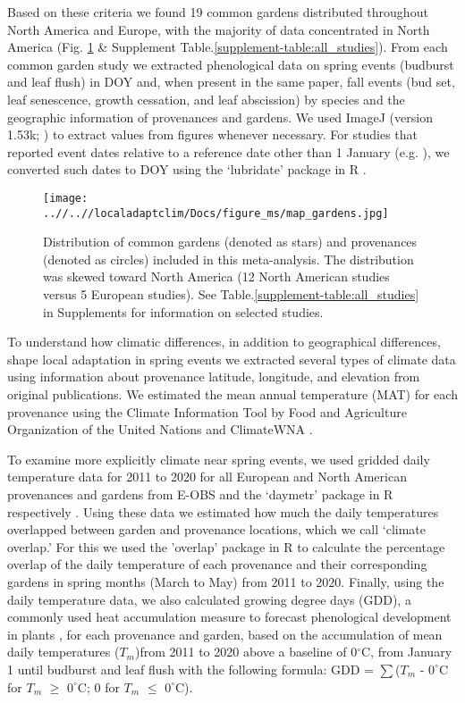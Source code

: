 \documentclass{article}
\begin{document}
Based on these criteria we found 19 common gardens distributed throughout North America and Europe, with the majority of data concentrated in North America (Fig. \ref{figure:map_gardens} \& Supplement Table.\ref{supplement-table:all_studies}). From each common garden study we extracted phenological data on spring events (budburst and leaf flush) in DOY and, when present in the same paper, fall events (bud set, leaf senescence, growth cessation, and leaf abscission) by species and the geographic information of provenances and gardens. We used ImageJ (version 1.53k; \citealp{schneider_rasband_eliceiri_2012}) to extract values from figures whenever necessary. For studies that reported event dates relative to a reference date other than 1 January (e.g. \citealp{Rehfeldt1994}), we converted such dates to DOY using the `lubridate' package in R \citep{Grolemund11}. %
\begin{figure}[!h] 
    \centering
 \texttt{[image: ..//..//localadaptclim/Docs/figure\_ms/map\_gardens.jpg]}
    \caption{Distribution of common gardens (denoted as stars) and provenances (denoted as circles) included in this meta-analysis. The distribution was skewed toward North America (12 North American studies versus 5 European studies). See Table.\ref{supplement-table:all_studies} in Supplements for information on selected studies.} 
    \label{figure:map_gardens}
\end{figure}
\newline
To understand how climatic differences, in addition to geographical differences, shape local adaptation in spring events we extracted several types of climate data using information about provenance latitude, longitude, and elevation from original publications. We estimated the mean annual temperature (MAT) for each provenance using the Climate Information Tool by Food and Agriculture Organization of the United Nations \citep{FAO2022}and ClimateWNA \citep{wang2016}. 

To examine more explicitly climate near spring events, we used gridded daily temperature data for 2011 to 2020 for all European and North American provenances and gardens from E-OBS and the `daymetr' package in R respectively \citep{cornes2018,hufkens2018}. Using these data we estimated how much the daily temperatures overlapped between garden and provenance locations, which we call `climate overlap.' For this we used the 'overlap' package in R to calculate the percentage overlap of the daily temperature of each provenance and their corresponding gardens in spring months (March to May) from 2011 to 2020. Finally, using the daily temperature data, we also calculated growing degree days (GDD), a commonly used heat accumulation measure to forecast phenological development in plants \citep{miller01}, for each provenance and garden, based on the accumulation of mean daily temperatures ($T_{m}$)from 2011 to 2020 above a baseline of 0$^{\circ}$C, from January 1 until budburst and leaf flush with the following formula: GDD = $\sum$($T_{m}$ - $0^{\circ}$C for $T_{m}$ $\ge$ $0^{\circ}$C; 0 for $T_{m}$ $\le$ $0^{\circ}$C). 
\end{document}
